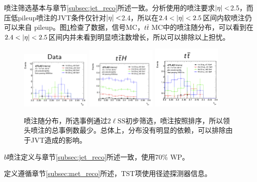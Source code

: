 喷注筛选基本与章节\ref{subsec:jet_reco}所述一致。分析使用的喷注要求$|\eta| <$2.5，而压低pileup喷注的JVT条件仅针对$|\eta| <$2.4，所以在$2.4<\abseta <2.5$区间内软喷注仍可以来自
pileup。图\ref{fig:jet:jvteta}检查了数据，信号MC，$t\bar{t}$ MC中的喷注随\abseta 分布，可以看到在$2.4<\abseta <2.5$区间内并未看到明显喷注数增长，所以可以排除以上担忧。
\begin{figure}[h]
\centering
\includegraphics[width=0.3\textwidth]{fig/JVTData.pdf}
\includegraphics[width=0.3\textwidth]{fig/JVTttH.pdf}
\includegraphics[width=0.3\textwidth]{fig/JVTttbar.pdf}
\caption{喷注随\abseta 分布，所选事例通过$2\ell\text{SS}$初步筛选，喷注按照\pt 排序，所以领头喷注的总事例数最少。总体上，分布没有明显的\abseta 依赖，可以排除由于JVT造成的影响。}
\label{fig:jet:jvteta}
\end{figure}

$b$喷注定义与章节\ref{subsec:jet_reco}所述一致，使用70\% WP。

\met 定义遵循章节\ref{subsec:met_reco}所述，TST项使用径迹探测器信息。

